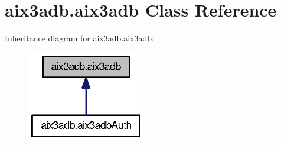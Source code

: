 \section{aix3adb.\-aix3adb Class Reference}
\label{classaix3adb_1_1aix3adb}


Inheritance diagram for aix3adb.\-aix3adb\-:
\nopagebreak
\begin{figure}[H]
\begin{center}
\leavevmode
\includegraphics[width=146pt]{classaix3adb_1_1aix3adb__inherit__graph}
\end{center}
\end{figure}

